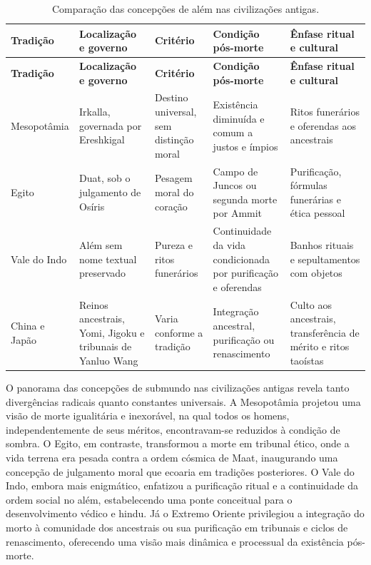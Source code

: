\begin{longtable}{@{}p{2.2cm}p{3.2cm}p{2.5cm}p{3.2cm}p{3.7cm}@{}}
\caption{Comparação das concepções de além nas civilizações antigas.}\\
\toprule
\textbf{Tradição} & \textbf{Localização e governo} & \textbf{Critério} & \textbf{Condição pós-morte} & \textbf{Ênfase ritual e cultural} \\
\midrule
\endfirsthead
\toprule
\textbf{Tradição} & \textbf{Localização e governo} & \textbf{Critério} & \textbf{Condição pós-morte} & \textbf{Ênfase ritual e cultural} \\
\midrule
\endhead
Mesopotâmia & Irkalla, governada por Ereshkigal & Destino universal, sem distinção moral & Existência diminuída e comum a justos e ímpios & Ritos funerários e oferendas aos ancestrais \\
Egito & Duat, sob o julgamento de Osíris & Pesagem moral do coração & Campo de Juncos ou segunda morte por Ammit & Purificação, fórmulas funerárias e ética pessoal \\
Vale do Indo & Além sem nome textual preservado & Pureza e ritos funerários & Continuidade da vida condicionada por purificação e oferendas & Banhos rituais e sepultamentos com objetos \\
China e Japão & Reinos ancestrais, Yomi, Jigoku e tribunais de Yanluo Wang & Varia conforme a tradição & Integração ancestral, purificação ou renascimento & Culto aos ancestrais, transferência de mérito e ritos taoístas \\
\bottomrule
\end{longtable}

O panorama das concepções de submundo nas civilizações antigas revela tanto divergências radicais quanto constantes universais. A Mesopotâmia projetou uma visão de morte igualitária e inexorável, na qual todos os homens, independentemente de seus méritos, encontravam-se reduzidos à condição de sombra. O Egito, em contraste, transformou a morte em tribunal ético, onde a vida terrena era pesada contra a ordem cósmica de Maat, inaugurando uma concepção de julgamento moral que ecoaria em tradições posteriores. O Vale do Indo, embora mais enigmático, enfatizou a purificação ritual e a continuidade da ordem social no além, estabelecendo uma ponte conceitual para o desenvolvimento védico e hindu. Já o Extremo Oriente privilegiou a integração do morto à comunidade dos ancestrais ou sua purificação em tribunais e ciclos de renascimento, oferecendo uma visão mais dinâmica e processual da existência pós-morte.

